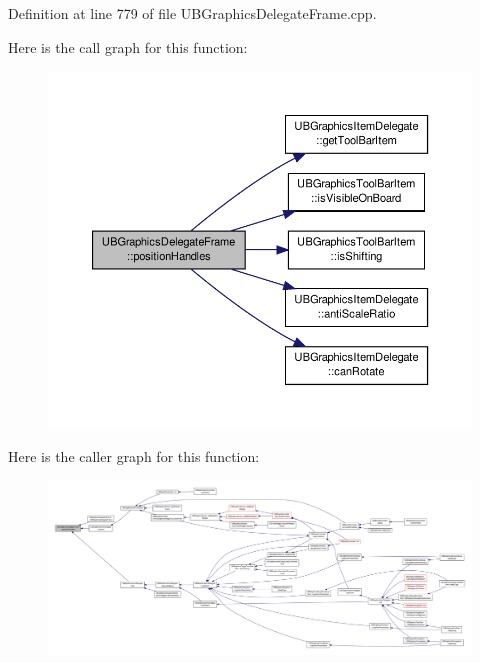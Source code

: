 Definition at line 779 of file U\-B\-Graphics\-Delegate\-Frame.\-cpp.



Here is the call graph for this function\-:
\nopagebreak
\begin{figure}[H]
\begin{center}
\leavevmode
\includegraphics[width=350pt]{d5/ded/class_u_b_graphics_delegate_frame_abfe38268d0d095ab895a27c0a8b5a833_cgraph}
\end{center}
\end{figure}




Here is the caller graph for this function\-:
\nopagebreak
\begin{figure}[H]
\begin{center}
\leavevmode
\includegraphics[width=350pt]{d5/ded/class_u_b_graphics_delegate_frame_abfe38268d0d095ab895a27c0a8b5a833_icgraph}
\end{center}
\end{figure}


